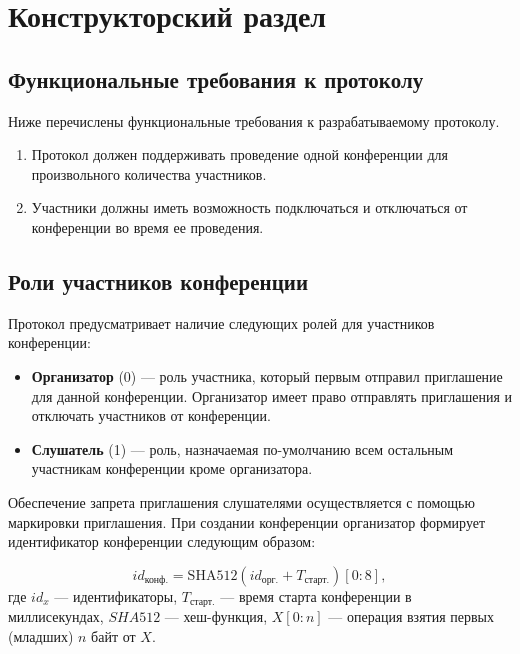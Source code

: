 \chapter{Конструкторский раздел}

\section{Функциональные требования к протоколу}

Ниже перечислены функциональные требования к разрабатываемому протоколу.

\begin{enumerate}
    \item Протокол должен поддерживать проведение одной конференции для произвольного количества участников.
    \item Участники должны иметь возможность подключаться и отключаться от конференции во время ее проведения.
\end{enumerate}

\section{Роли участников конференции}

Протокол предусматривает наличие следующих ролей для участников конференции:
\begin{itemize}[label=---]
  \item \textbf{Организатор} (0) --- роль участника, который первым отправил приглашение для данной конференции.
  Организатор имеет право отправлять приглашения и отключать участников от конференции.
  \item \textbf{Слушатель} (1) --- роль, назначаемая по-умолчанию всем остальным участникам конференции кроме организатора.
\end{itemize}

Обеспечение запрета приглашения слушателями осуществляется с помощью маркировки приглашения.
При создании конференции организатор формирует идентификатор конференции следующим образом:

\begin{equation}
  \textit{id}_\textrm{конф.} = \textrm{SHA512}(\textit{id}_\textrm{орг.} + T_\textrm{старт.})[0:8], \label{eq:conf-id}
\end{equation}
где $id_x$ --- идентификаторы, $T_\textrm{старт.}$ --- время старта конференции в миллисекундах, $SHA512$ --- хеш-функция, $X[0:n]$ --- операция взятия первых (младших) $n$ байт от $X$.

